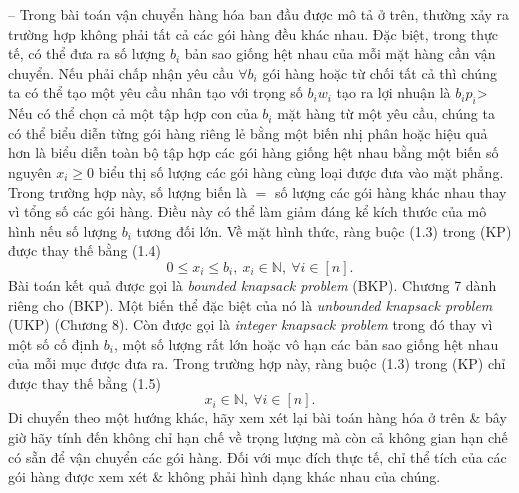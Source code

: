 \documentclass{article}
\begin{document}
\begin{itemize}
\begin{itemize}
        -- Trong bài toán vận chuyển hàng hóa ban đầu được mô tả ở trên, thường xảy ra trường hợp không phải tất cả các gói hàng đều khác nhau. Đặc biệt, trong thực tế, có thể đưa ra số lượng $b_i$ bản sao giống hệt nhau của mỗi mặt hàng cần vận chuyển. Nếu phải chấp nhận yêu cầu $\forall b_i$ gói hàng hoặc từ chối tất cả thì chúng ta có thể tạo một yêu cầu nhân tạo với trọng số $b_iw_i$ tạo ra lợi nhuận là $b_ip_i$> Nếu có thể chọn cả một tập hợp con của $b_i$ mặt hàng từ một yêu cầu, chúng ta có thể biểu diễn từng gói hàng riêng lẻ bằng một biến nhị phân hoặc hiệu quả hơn là biểu diễn toàn bộ tập hợp các gói hàng giống hệt nhau bằng một biến số nguyên $x_i\ge0$ biểu thị số lượng các gói hàng cùng loại được đưa vào mặt phẳng. Trong trường hợp này, số lượng biến là $=$ số lượng các gói hàng khác nhau thay vì tổng số các gói hàng. Điều này có thể làm giảm đáng kể kích thước của mô hình nếu số lượng $b_i$ tương đối lớn. Về mặt hình thức, ràng buộc (1.3) trong (KP) được thay thế bằng (1.4)
        \begin{equation*}
            0\le x_i\le b_i,\ x_i\in\mathbb{N},\ \forall i\in[n].
        \end{equation*}
        Bài toán kết quả được gọi là {\it bounded knapsack problem} (BKP). Chương 7 dành riêng cho (BKP). Một biến thể đặc biệt của nó là {\it unbounded knapsack problem} (UKP) (Chương 8). Còn được gọi là {\it integer knapsack problem} trong đó thay vì một số cố định $b_i$, một số lượng rất lớn hoặc vô hạn các bản sao giống hệt nhau của mỗi mục được đưa ra. Trong trường hợp này, ràng buộc (1.3) trong (KP) chỉ được thay thế bằng (1.5)
        \begin{equation*}
            x_i\in\mathbb{N},\ \forall i\in[n].
        \end{equation*}
        Di chuyển theo một hướng khác, hãy xem xét lại bài toán hàng hóa ở trên \& bây giờ hãy tính đến không chỉ hạn chế về trọng lượng mà còn cả không gian hạn chế có sẵn để vận chuyển các gói hàng. Đối với mục đích thực tế, chỉ thể tích của các gói hàng được xem xét \& không phải hình dạng khác nhau của chúng.
        

\end{itemize}
\end{itemize}
\end{document}
